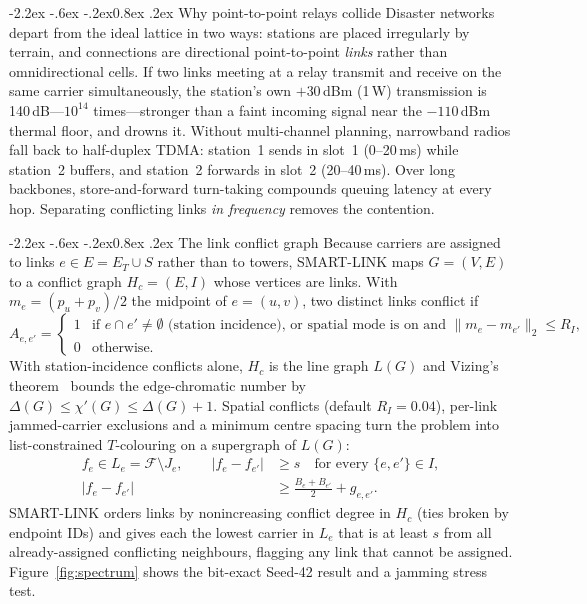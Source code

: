 \documentclass[10pt,a4paper]{article}
\makeatletter
\renewcommand\subsection{\@startsection{subsection}{2}{\z@}%
  {-2.2ex \@plus -.6ex \@minus -.2ex}{0.8ex \@plus .2ex}%
  {\normalfont\normalsize\bfseries}}
\makeatother
\begin{document}
\subsection{Why point-to-point relays collide}
Disaster networks depart from the ideal lattice in two ways: stations are placed irregularly by terrain, and
connections are directional point-to-point \emph{links} rather than omnidirectional cells. If two links meeting at a
relay transmit and receive on the same carrier simultaneously, the station's own $+30$\,dBm (1\,W) transmission is
140\,dB---$10^{14}$ times---stronger than a faint incoming signal near the $-110$\,dBm thermal floor, and drowns it.
Without multi-channel planning, narrowband radios fall back to half-duplex TDMA: station~1 sends in slot~1 (0--20\,ms) while
station~2 buffers, and station~2 forwards in slot~2 (20--40\,ms). Over long backbones, store-and-forward turn-taking
compounds queuing latency at every hop. Separating conflicting links \emph{in frequency} removes the contention.

\subsection{The link conflict graph}
Because carriers are assigned to links $e\in E=E_T\cup S$ rather than to towers, SMART-LINK maps $G=(V,E)$ to a conflict
graph $H_c=(E,I)$ whose vertices are links. With $m_e=(p_u+p_v)/2$ the midpoint of $e=(u,v)$, two distinct links conflict if
\begin{equation}\label{eq:conflict}
  A_{e,e'}=\begin{cases}
    1 & \text{if } e\cap e'\neq\emptyset \text{ (station incidence), or spatial mode is on and } \|m_e-m_{e'}\|_2\le R_I,\\
    0 & \text{otherwise.}\end{cases}
\end{equation}
With station-incidence conflicts alone, $H_c$ is the line graph $L(G)$ and Vizing's theorem~\cite{vizing} bounds the
edge-chromatic number by $\Delta(G)\le\chi'(G)\le\Delta(G)+1$. Spatial conflicts (default $R_I=0.04$), per-link jammed-carrier
exclusions and a minimum centre spacing turn the problem into list-constrained $T$-colouring on a supergraph of $L(G)$:
\begin{align}
  f_e\in L_e=\mathcal F\setminus J_e,\qquad |f_e-f_{e'}|&\ge s \quad\text{for every }\{e,e'\}\in I, \label{eq:sep}\\
  |f_e-f_{e'}|&\ge \tfrac{B_e+B_{e'}}{2}+g_{e,e'}. \label{eq:guard}
\end{align}
SMART-LINK orders links by nonincreasing conflict degree in $H_c$ (ties broken by endpoint IDs) and gives each the lowest
carrier in $L_e$ that is at least $s$ from all already-assigned conflicting neighbours, flagging any link that cannot be
assigned. Figure~\ref{fig:spectrum} shows the bit-exact Seed-42 result and a jamming stress test.
\end{document}
